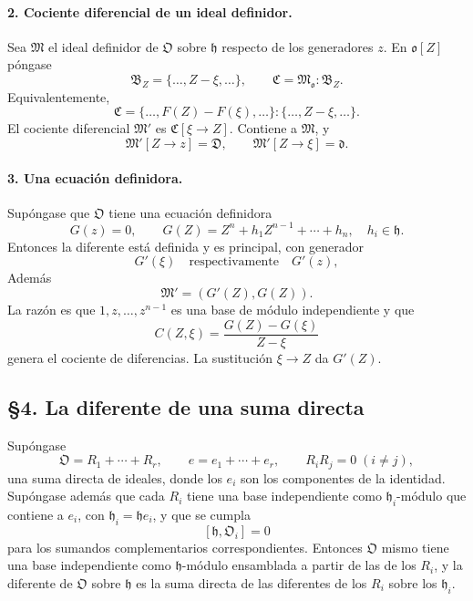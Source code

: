 \documentclass[11pt]{article}
\begin{document}
\paragraph{2. Cociente diferencial de un ideal definidor.}
Sea $\mathfrak M$ el ideal definidor de $\mathfrak O$ sobre $\mathfrak h$ respecto de los generadores $z$. En $\mathfrak o[Z]$ póngase
\[
        \mathfrak B_Z=\{\ldots,Z-\xi,\ldots\},
        \qquad
        \mathfrak C=\mathfrak M_{\mathfrak o}:\mathfrak B_Z.
\]
Equivalentemente,
\[
        \mathfrak C=\{\ldots,F(Z)-F(\xi),\ldots\}:\{\ldots,Z-\xi,\ldots\}.
\]
El cociente diferencial $\mathfrak M'$ es $\mathfrak C[\xi\to Z]$. Contiene a $\mathfrak M$, y
\[
        \mathfrak M'[Z\to z]=\mathfrak D,
        \qquad
        \mathfrak M'[Z\to\xi]=\mathfrak d.
\]

\paragraph{3. Una ecuación definidora.}
Supóngase que $\mathfrak O$ tiene una ecuación definidora
\[
        G(z)=0,
        \qquad
        G(Z)=Z^n+h_1Z^{n-1}+\cdots+h_n,
        \quad h_i\in\mathfrak h.
\]
Entonces la diferente está definida y es principal, con generador
\[
        G'(\xi) \quad\text{respectivamente}\quad G'(z),
\]
Además
\[
        \mathfrak M'=(G'(Z),G(Z)).
\]
La razón es que $1,z,\ldots,z^{n-1}$ es una base de módulo independiente y que
\[
        C(Z,\xi)=\frac{G(Z)-G(\xi)}{Z-\xi}
\]
genera el cociente de diferencias. La sustitución $\xi\to Z$ da $G'(Z)$.

\subsection*{§4. La diferente de una suma directa}

Supóngase
\[
        \mathfrak O=R_1+\cdots+R_r,
        \qquad
        e=e_1+\cdots+e_r,
        \qquad
        R_iR_j=0\;(i\ne j),
\]
una suma directa de ideales, donde los $e_i$ son los componentes de la identidad. Supóngase además que cada $R_i$ tiene una base independiente como $\mathfrak h_i$-módulo que contiene a $e_i$, con $\mathfrak h_i=\mathfrak h e_i$, y que se cumpla
\[
        [\mathfrak h,\mathfrak O_i]=0
\]
para los sumandos complementarios correspondientes. Entonces $\mathfrak O$ mismo tiene una base independiente como $\mathfrak h$-módulo ensamblada a partir de las de los $R_i$, y la diferente de $\mathfrak O$ sobre $\mathfrak h$ es la suma directa de las diferentes de los $R_i$ sobre los $\mathfrak h_i$.
\end{document}
